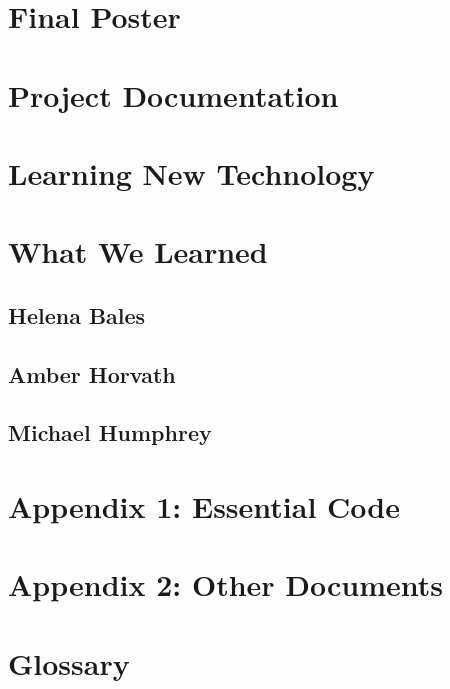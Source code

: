 \documentclass[letterpaper,10pt]{article}
\begin{document}
\clearpage
\section{Final Poster}
\clearpage 

\section{Project Documentation}


\section{Learning New Technology}


\section{What We Learned}
\subsection{Helena Bales}

\subsection{Amber Horvath}

\subsection{Michael Humphrey}


\section{Appendix 1: Essential Code}


\section{Appendix 2: Other Documents}


\section{Glossary}
\glsaddall
\printglossaries
\end{document}
